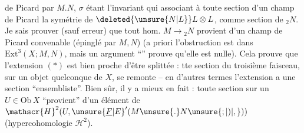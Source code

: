 \margin{\mbox{-- --}}

 de Picard  par $M.N$, $\sigma$ étant l'invariant qui  associant à toute section  d'un champ de Picard la symétrie de $\deleted{\unsure{N|L}}L\otimes L$,  comme section de ${}_{2}N$. Je sais prouver (sauf erreur) que tout hom. $M\to{}_{2}N$ provient d'un champ de Picard convenable (épinglé par $M,N$) (a priori l'obstruction est dans $\mathrm{Ext}^{3}(X;M,N)$, mais un argument ``'' prouve qu'elle est nulle). Cela prouve que l'extension $(*)$ est bien proche d'être splittée :  tte section du troisième faisceau, sur un objet quelconque de $X$, se remonte -- en d'autres termes l'extension a une section ``ensembliste''. Bien sûr, il y a mieux en fait : toute section sur un $U\in\mathrm{Ob}\,X$ ``provient'' d'un élément de $\mathscr{H}^{2}(U,{\unsure{\underline{F}|E}}'(M\unsure{.}N\unsure{;|)|,}))$ (hypercohomologie $\mathscr{H}^{2}$).

